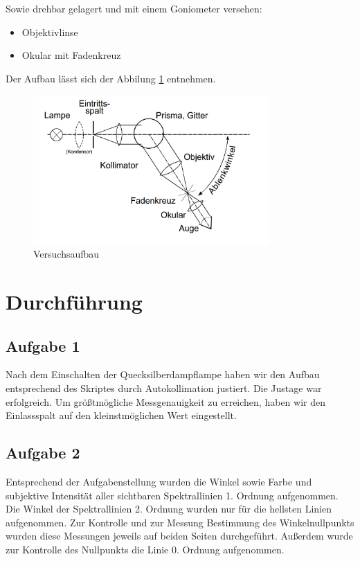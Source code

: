 \documentclass[a4paper,german,12pt,smallheadings]{scrartcl}
\begin{document}
Sowie drehbar gelagert und mit einem Goniometer versehen:

\begin{itemize}
  \item Objektivlinse
  \item Okular mit Fadenkreuz
\end{itemize}

Der Aufbau lässt sich der Abbilung \ref{fig:aufbau} entnehmen.

\begin{figure}[h!]
    \centering
    \includegraphics[width=0.8\textwidth]{aufbau.png}
    \caption{Versuchsaufbau}
    \label{fig:aufbau}
\end{figure}

\section{Durchführung}
\subsection{Aufgabe 1}

Nach dem Einschalten der Quecksilberdampflampe haben wir den Aufbau
entsprechend des Skriptes durch Autokollimation justiert. Die Justage war
erfolgreich. Um größtmögliche Messgenauigkeit zu erreichen, haben wir den
Einlassspalt auf den kleinstmöglichen Wert eingestellt.

\subsection{Aufgabe 2}

Entsprechend der Aufgabenstellung wurden die Winkel sowie Farbe und subjektive
Intensität aller sichtbaren Spektrallinien 1. Ordnung aufgenommen. Die Winkel
der Spektrallinien 2. Ordnung wurden nur für die hellsten Linien aufgenommen.
Zur Kontrolle und zur Messung Bestimmung des Winkelnullpunkts wurden diese
Messungen jeweils auf beiden Seiten durchgeführt. Außerdem wurde zur Kontrolle
des Nullpunkts die Linie 0. Ordnung aufgenommen.
\end{document}
